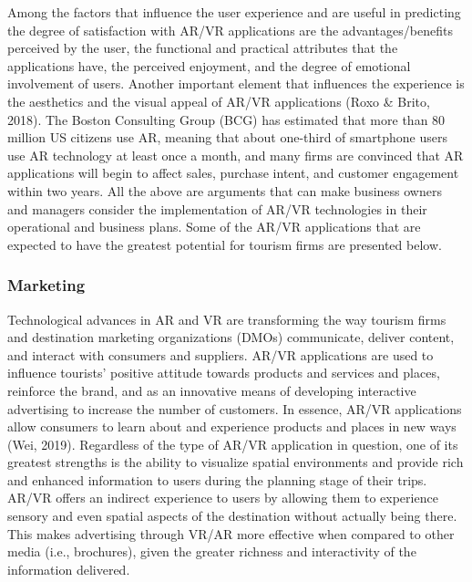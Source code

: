 \documentclass[
  letterpaper,
  DIV=11,
  numbers=noendperiod]{scrreprt}
\begin{document}
Among the factors that influence the user experience and are useful in
predicting the degree of satisfaction with AR/VR applications are the
advantages/benefits perceived by the user, the functional and practical
attributes that the applications have, the perceived enjoyment, and the
degree of emotional involvement of users. Another important element that
influences the experience is the aesthetics and the visual appeal of
AR/VR applications (Roxo \& Brito, 2018). The Boston Consulting Group
(BCG) has estimated that more than 80 million US citizens use AR,
meaning that about one-third of smartphone users use AR technology at
least once a month, and many firms are convinced that AR applications
will begin to affect sales, purchase intent, and customer engagement
within two years. All the above are arguments that can make business
owners and managers consider the implementation of AR/VR technologies in
their operational and business plans. Some of the AR/VR applications
that are expected to have the greatest potential for tourism firms are
presented below.

\hypertarget{marketing-1}{%
\subsubsection{Marketing}\label{marketing-1}}

Technological advances in AR and VR are transforming the way tourism
firms and destination marketing organizations (DMOs) communicate,
deliver content, and interact with consumers and suppliers. AR/VR
applications are used to influence tourists' positive attitude towards
products and services and places, reinforce the brand, and as an
innovative means of developing interactive advertising to increase the
number of customers. In essence, AR/VR applications allow consumers to
learn about and experience products and places in new ways (Wei, 2019).
Regardless of the type of AR/VR application in question, one of its
greatest strengths is the ability to visualize spatial environments and
provide rich and enhanced information to users during the planning stage
of their trips. AR/VR offers an indirect experience to users by allowing
them to experience sensory and even spatial aspects of the destination
without actually being there. This makes advertising through VR/AR more
effective when compared to other media (i.e., brochures), given the
greater richness and interactivity of the information delivered.
\end{document}

